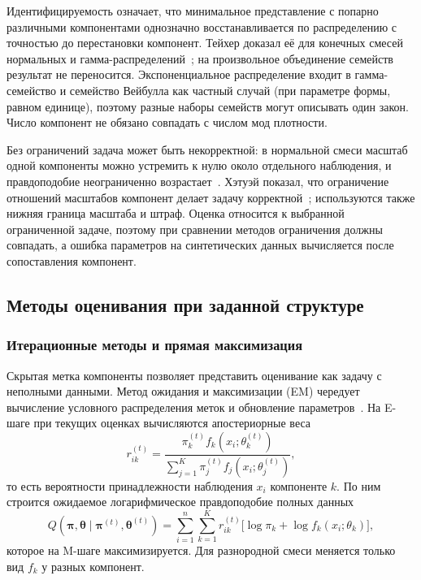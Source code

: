 Идентифицируемость означает, что минимальное представление с попарно различными компонентами однозначно восстанавливается по распределению с точностью до перестановки компонент. Тейхер доказал её для конечных смесей нормальных и гамма-распределений~\cite{Teicher1963}; на произвольное объединение семейств результат не переносится. Экспоненциальное распределение входит в гамма-семейство и семейство Вейбулла как частный случай (при параметре формы, равном единице), поэтому разные наборы семейств могут описывать один закон. Число компонент не обязано совпадать с числом мод плотности.

Без ограничений задача может быть некорректной: в нормальной смеси масштаб одной компоненты можно устремить к нулю около отдельного наблюдения, и правдоподобие неограниченно возрастает~\cite{RednerWalker1984}. Хэтуэй показал, что ограничение отношений масштабов компонент делает задачу корректной~\cite{Hathaway1985}; используются также нижняя граница масштаба и штраф. Оценка относится к выбранной ограниченной задаче, поэтому при сравнении методов ограничения должны совпадать, а ошибка параметров на синтетических данных вычисляется после сопоставления компонент.

\subsection{Методы оценивания при заданной структуре}
\label{subsec:mixture-estimation-methods}

\subsubsection{Итерационные методы и прямая максимизация}

Скрытая метка компоненты позволяет представить оценивание как задачу с неполными данными. Метод ожидания и максимизации (EM) чередует вычисление условного распределения меток и обновление параметров~\cite{Dempster1977,RednerWalker1984}. На E-шаге при текущих оценках вычисляются апостериорные веса
\[
    r_{ik}^{(t)}=
    \frac{\pi_k^{(t)}f_k(x_i;\theta_k^{(t)})}
    {\sum_{j=1}^{K}\pi_j^{(t)}f_j(x_i;\theta_j^{(t)})},
\]
то есть вероятности принадлежности наблюдения $x_i$ компоненте $k$. По ним строится ожидаемое логарифмическое правдоподобие полных данных
\[
    Q(\boldsymbol{\pi},\boldsymbol{\theta}\mid
    \boldsymbol{\pi}^{(t)},\boldsymbol{\theta}^{(t)})
    =\sum_{i=1}^{n}\sum_{k=1}^{K}r_{ik}^{(t)}
    \bigl[\log\pi_k+\log f_k(x_i;\theta_k)\bigr],
\]
которое на M-шаге максимизируется. Для разнородной смеси меняется только вид $f_k$ у разных компонент.

